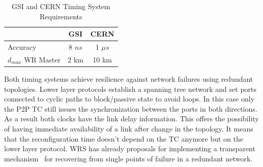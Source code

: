 \begin{table}[!t]
\caption{GSI and CERN Timing System Requirements}
\centering
\begin{tabular}{l c c } 
\hline
    & \textbf{GSI} & \textbf{CERN} \\  \hline \hline
  Accuracy & 8 $ns$ & 1 $\mu s$  \\  \hline
  $d_{max}$ WR Master & 2 km & 10 km \\ \hline  
\end{tabular}
\label{tab:req}
\end{table}

Both timing systems achieve resilience against network failures using redundant
topologies. Lower layer protocols establish a spanning tree network and set ports connected to cyclic paths to block/passive
state to avoid loops. In this case only the P2P TC still issues the synchronization between the
ports in both directions. As a result both clocks have the link delay
information. This offers the possibility of having immediate availability of a
link after change in the topology. It means that the reconfiguration time 
doesn't depend on the TC anymore but on the  lower layer protocol. WRS has already 
proposals for implementing a transparent mechanism~\cite{biblio:wrswitch} for
recovering from single points of failure in a redundant network.
